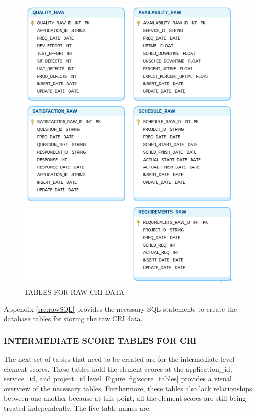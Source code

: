 \documentclass[SDSUThesis.tex]{subfiles}
\begin{document}
           \begin{figure}[ht]
                \centering
                \includegraphics[scale=.55]{images/raw_tables.png}
                \caption{TABLES FOR RAW CRI DATA}
                \label{fig:raw}
            \end{figure}
            
            Appendix \ref{src:rawSQL} provides the necessary SQL statements to create the 
            database tables for storing the raw CRI data.  
            
        \subsubsection{INTERMEDIATE SCORE TABLES FOR CRI}
            The next set of tables that need to be created are for the 
            intermediate level element scores.  These tables hold the
            element scores at the application\_id, service\_id, and project\_id
            level.  Figure \ref{fig:score_tables} provides a visual overview
            of the necessary tables.  Furthermore, these tables also lack
            relationships between one another because at this point, all the
            element scores are still being treated independently.  The five
            table names are:
            
\end{document}
